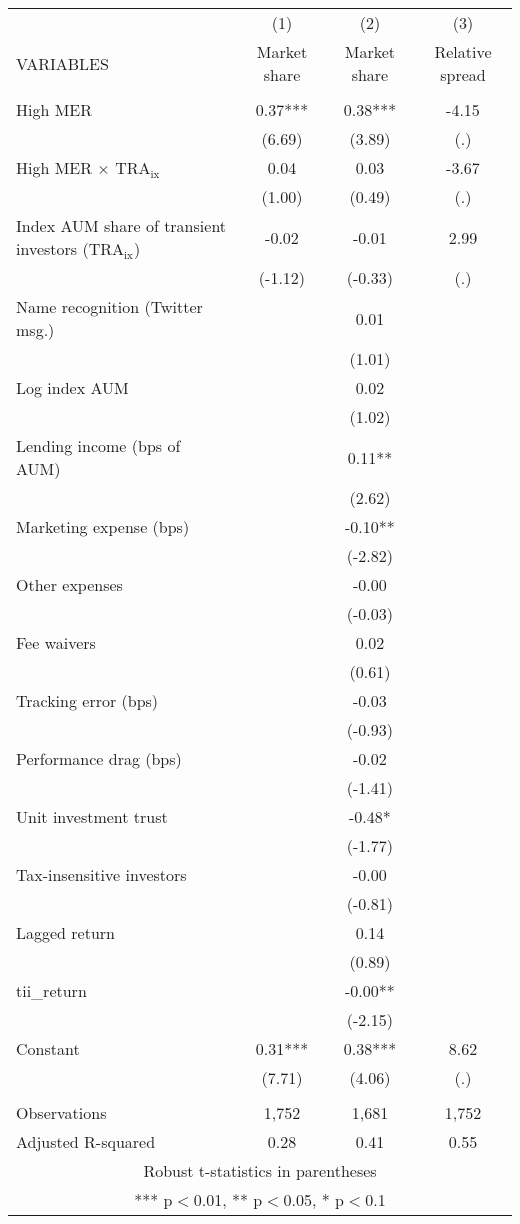 \documentclass[]{article}
\begin{document}
\begin{tabular}{lccc} \hline
 & (1) & (2) & (3) \\
VARIABLES & Market share & Market share & Relative spread \\ \hline
 &  &  &  \\
High MER & 0.37*** & 0.38*** & -4.15 \\
 & (6.69) & (3.89) & (.) \\
High MER $\times$ $\text{TRA}_\text{ix}$ & 0.04 & 0.03 & -3.67 \\
 & (1.00) & (0.49) & (.) \\
Index AUM share of transient investors ($\text{TRA}_\text{ix}$) & -0.02 & -0.01 & 2.99 \\
 & (-1.12) & (-0.33) & (.) \\
Name recognition (Twitter msg.) &  & 0.01 &  \\
 &  & (1.01) &  \\
Log index AUM &  & 0.02 &  \\
 &  & (1.02) &  \\
Lending income (bps of AUM) &  & 0.11** &  \\
 &  & (2.62) &  \\
Marketing expense (bps) &  & -0.10** &  \\
 &  & (-2.82) &  \\
Other expenses &  & -0.00 &  \\
 &  & (-0.03) &  \\
Fee waivers &  & 0.02 &  \\
 &  & (0.61) &  \\
Tracking error (bps) &  & -0.03 &  \\
 &  & (-0.93) &  \\
Performance drag (bps) &  & -0.02 &  \\
 &  & (-1.41) &  \\
Unit investment trust &  & -0.48* &  \\
 &  & (-1.77) &  \\
Tax-insensitive investors &  & -0.00 &  \\
 &  & (-0.81) &  \\
Lagged return &  & 0.14 &  \\
 &  & (0.89) &  \\
tii\_return &  & -0.00** &  \\
 &  & (-2.15) &  \\
Constant & 0.31*** & 0.38*** & 8.62 \\
 & (7.71) & (4.06) & (.) \\
 &  &  &  \\
Observations & 1,752 & 1,681 & 1,752 \\
 Adjusted R-squared & 0.28 & 0.41 & 0.55 \\ \hline
\multicolumn{4}{c}{ Robust t-statistics in parentheses} \\
\multicolumn{4}{c}{ *** p$<$0.01, ** p$<$0.05, * p$<$0.1} \\
\end{tabular}
\end{document}

